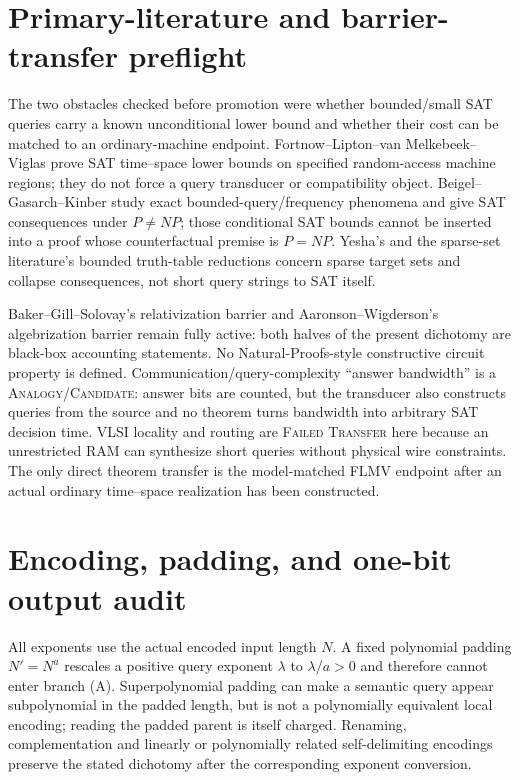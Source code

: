 \documentclass[11pt]{article}
\newcommand{\status}[1]{\textsc{#1}}
\begin{document}
\section{Primary-literature and barrier-transfer preflight}

The two obstacles checked before promotion were whether bounded/small SAT
queries carry a known unconditional lower bound and whether their cost can be
matched to an ordinary-machine endpoint.  Fortnow--Lipton--van Melkebeek--
Viglas prove SAT time--space lower bounds on specified random-access machine
regions; they do not force a query transducer or compatibility object.
Beigel--Gasarch--Kinber study exact bounded-query/frequency phenomena and give
SAT consequences under $P\ne NP$; those conditional SAT bounds cannot be
inserted into a proof whose counterfactual premise is $P=NP$.  Yesha's and
the sparse-set literature's bounded truth-table reductions concern sparse
target sets and collapse consequences, not short query strings to SAT itself.

Baker--Gill--Solovay's relativization barrier and Aaronson--Wigderson's
algebrization barrier remain fully active: both halves of the present
dichotomy are black-box accounting statements.  No Natural-Proofs-style
constructive circuit property is defined.  Communication/query-complexity
``answer bandwidth'' is a \status{Analogy/Candidate}: answer bits are counted,
but the transducer also constructs queries from the source and no theorem
turns bandwidth into arbitrary SAT decision time.  VLSI locality and routing
are \status{Failed Transfer} here because an unrestricted RAM can synthesize
short queries without physical wire constraints.  The only direct theorem
transfer is the model-matched FLMV endpoint after an actual ordinary
time--space realization has been constructed.

\section{Encoding, padding, and one-bit output audit}

All exponents use the actual encoded input length $N$.  A fixed polynomial
padding $N'=N^a$ rescales a positive query exponent $\lambda$ to
$\lambda/a>0$ and therefore cannot enter branch (A).  Superpolynomial padding
can make a semantic query appear subpolynomial in the padded length, but is
not a polynomially equivalent local encoding; reading the padded parent is
itself charged.  Renaming, complementation and linearly or polynomially
related self-delimiting encodings preserve the stated dichotomy after the
corresponding exponent conversion.
\end{document}

